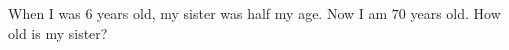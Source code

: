 When I was $6$ years old, my sister was half my age. Now I am $70$ years old. How old is my sister?
